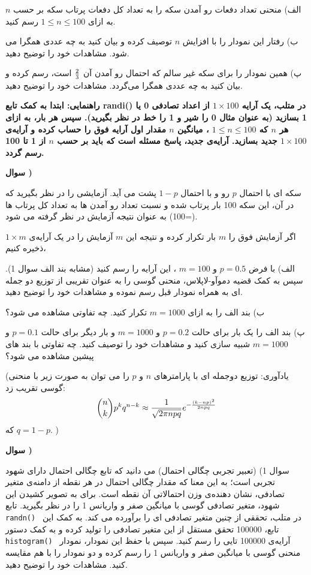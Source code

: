 \documentclass[10pt,letterpaper]{report}
\newcounter{questionnumber}
\newcommand{\Q}{
\textbf{سوال \thequestionnumber)}
\stepcounter{questionnumber}
}
\begin{document}
الف) منحنی تعداد دفعات رو آمدن سکه را به تعداد کل دفعات پرتاب سکه بر حسب $n$ به ازای $1\le n\le 100$ رسم کنید.

ب) رفتار این نمودار را با افزایش $n$ توصیف کرده و بیان کنید به چه عددی همگرا می شود. مشاهدات خود را توضیح دهید.

پ) همین نمودار را برای سکه غیر سالم که احتمال رو آمدن آن
$
{2\over 3}
$
است،  رسم کرده و بیان کنید به چه عددی همگرا می‌گردد. مشاهدات خود را توضیح دهید.

\textbf{
راهنمایی: ابتدا به کمک تابع 
randi()
در متلب، یک آرایه 
$1\times 100$
 از اعداد تصادفی 0 یا 1 بسازید (به عنوان مثال 0 را شیر و 1 را خط در نظر بگیرید). سپس هر بار، به ازای هر $n$ که
$1\le n \le 100$
، 
میانگین
$n$
 مقدار اول آرایه فوق را حساب کرده و آرایه‌ی $1\times 100$ جدید بسازید. آرایه‌ی جدید، پاسخ مسئله است که باید بر حسب $n$ از 1 تا 100 رسم گردد.
}



\Q
سکه ای با احتمال $p$ رو و با احتمال $1-p$ پشت می آید. آزمایشی را در نظر بگیرید که در آن، این سکه 100 بار پرتاب شده و نسبت تعداد رو آمدن ها به تعداد کل پرتاب ها (=100) به عنوان نتیجه آزمایش در نظر گرفته می شود.

اگر آزمایش فوق را $m$ بار تکرار کرده و نتیجه این $m$ آزمایش را در یک آرایه‌ی 
$
1\times m
$
 ذخیره کنیم،

الف) با فرض 
$
p=0.5
$
و
$
m=100
$
، این آرایه را رسم کنید (مشابه بند الف سوال 1). سپس به کمک قضیه دموآو-لاپلاس، منحنی گوسی را به عنوان تقریبی از توزیع دو جمله ای به همراه نمودار قبل رسم نموده و مشاهدات خود را توضیح دهید.

ب) بند الف را به ازای $m=1000$ تکرار کنید. چه تفاوتی مشاهده می شود؟

پ) بند الف را یک بار برای حالت 
$
p=0.2
$
و
$
m=1000
$
و بار دیگر برای حالت 
$
p=0.1
$
و
$
m=1000
$
شبیه سازی کنید و مشاهدات خود را توصیف کنید. چه تفاوتی با بند های پیشین مشاهده می شود؟

(یادآوری: توزیع دوجمله ای با پارامترهای $n$ و $p$ را می توان به صورت زیر با منحنی گوسی تقریب زد:
$$
\binom{n}{k}p^kq^{n-k}\approx {1\over\sqrt{2\pi npq}}e^{-{(k-np)^2\over 2npq}}
$$
که 
$
q=1-p
$.
)

\Q
سوال 1) (تعبیر تجربی چگالی احتمال) می دانید که تابع چگالی احتمال دارای شهود تجربی است؛ به این معنا که مقدار چگالی احتمال در هر نقطه از دامنه‌ی متغیر تصادفی، نشان دهنده‌ی وزن احتمالاتی آن نقطه است. برای به تصویر کشیدن این شهود، متغیر تصادفی گوسی با میانگین صفر و واریانس 1 را در نظر بگیرید. تابع
\texttt{
randn()
}
در متلب، تحققی از چنین متغیر تصادفی ای را برآورده می کند. به کمک این تابع، 100000 تحقق مستقل از این متغیر تصادفی را تولید کرده و به کمک دستور 
\texttt{
histogram()
}
آرایه‌ی 100000 تایی را رسم کنید. سپس با حفظ این نمودار، نمودار منحنی گوسی با میانگین صفر و واریانس 1 را رسم کرده و دو نمودار را با هم مقایسه کنید. مشاهدات خود را توضیح دهید.
\end{document}
